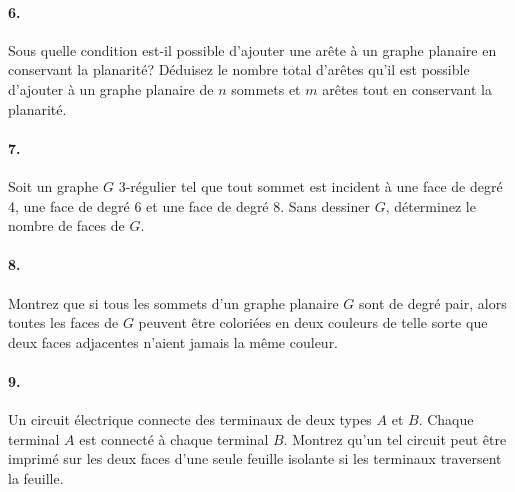 \paragraph{6. } Sous quelle condition est-il possible d’ajouter une arête à un graphe planaire en conservant la planarité? Déduisez le nombre total d’arêtes qu’il est possible d’ajouter à un graphe planaire de $n$ sommets et $m$ arêtes tout en conservant la planarité.

\paragraph{7. } Soit un graphe $G$ 3-régulier tel que tout sommet est incident à une face de degré 4, une face de degré 6 et une face de degré 8. Sans dessiner $G$, déterminez le nombre de faces de $G$.

\paragraph{8. }Montrez que si tous les sommets d’un graphe planaire $G$ sont de degré pair, alors toutes les faces de $G$ peuvent être coloriées en deux couleurs de telle sorte que deux faces adjacentes n’aient jamais la même couleur.

\paragraph{9. } Un circuit électrique connecte des terminaux de deux types $A$ et $B$. Chaque terminal $A$ est connecté à chaque terminal $B$. Montrez qu’un tel circuit peut être imprimé sur les deux faces d’une seule feuille isolante si les terminaux traversent la feuille.
